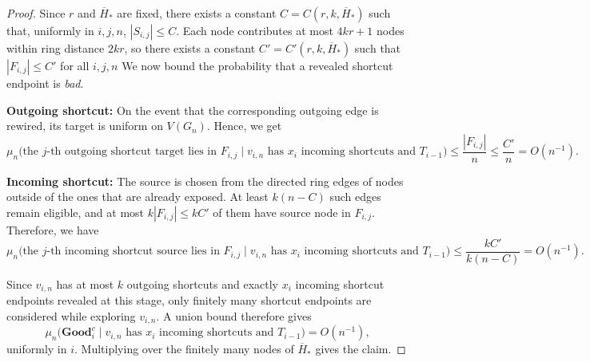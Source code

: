 \documentclass[10pt]{amsart}
\begin{document}
\begin{proof}
Since $r$ and $\overline{H}_*$ are fixed, there exists a
constant $C=C(r,k,\overline{H}_*)$ such that, uniformly in $i,j,n$,
\(
|S_{i,j}|\le C.
\)
Each node contributes at most $4kr+1$ nodes within ring distance $2kr$, so
there exists a constant $C'=C'(r,k,\overline{H}_*)$ such that
\(
|F_{i,j}|\le C'
\)
for all $i,j,n$
We now bound the probability that a revealed shortcut endpoint is \textit{bad}.

\noindent\textbf{Outgoing shortcut:}
On the event that
the corresponding outgoing edge is rewired, its target is uniform on $V(G_n)$.
Hence, we get
\[
\mu_n\big(
\text{the $j$-th outgoing shortcut target lies in }F_{i,j}
\mid v_{i,n}\text{ has }x_i\text{ incoming shortcuts and } T_{i-1}
\big)
\le \frac{|F_{i,j}|}{n}
\le \frac{C'}{n}
= O(n^{-1}).
\]

\noindent\textbf{Incoming shortcut:}
The source is chosen from the directed ring
edges of nodes outside of the ones that are already exposed. At least $k(n-C)$ such edges remain eligible, and at most $k|F_{i,j}|\le
kC'$ of them have source node in $F_{i,j}$. Therefore, we have
\[
\mu_n\big(
\text{the $j$-th incoming shortcut source lies in }F_{i,j}
\mid v_{i,n}\text{ has }x_i\text{ incoming shortcuts and } T_{i-1}
\big)
\le \frac{kC'}{k(n-C)}
= O(n^{-1}).
\]

Since $v_{i,n}$ has at most $k$ outgoing shortcuts and exactly $x_i$ incoming
shortcut endpoints revealed at this stage, only finitely many shortcut endpoints
are considered while exploring $v_{i,n}$. A union bound therefore gives
\[
\mu_n\big(\mathbf{Good}_i^c\mid
v_{i,n}\text{ has }x_i\text{ incoming shortcuts and }T_{i-1}\big)
=O\!\left(n^{-1}\right),
\]
uniformly in $i$. Multiplying over the finitely many nodes of
$\overline{H}_*$ gives the claim.
\end{proof}
\end{document}

